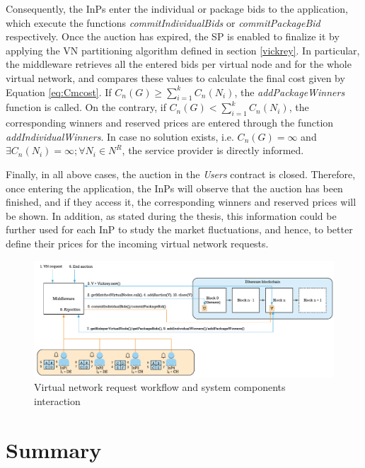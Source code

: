 Consequently, the InPs enter the individual or package bids to the application, which execute the functions \textit{commitIndividualBids} or \textit{commitPackageBid} respectively. Once the auction has expired, the SP is enabled to finalize it by applying the VN partitioning algorithm defined in section \ref{vickrey}. In particular, the middleware retrieves all the entered bids per virtual node and for the whole virtual network, and compares these values to calculate the final cost given by Equation \ref{eq:Cmcost}. If $C_n(G) \geq \sum_{i=1}^{k} C_n(N_i)$, the \textit{addPackageWinners} function is called. On the contrary, if $C_n(G) < \sum_{i=1}^{k} C_n(N_i)$, the corresponding winners and reserved prices are entered through the function \textit{addIndividualWinners}. In case no solution exists, i.e. $C_n(G) = \infty$ and $\exists C_n(N_i) = \infty; \forall N_i \in N^{R}$, the service provider is directly informed.

Finally, in all above cases, the auction in the \textit{Users} contract is closed. Therefore, once entering the application, the InPs will observe that the auction has been finished, and if they access it, the corresponding winners and reserved prices will be shown. In addition, as stated during the thesis, this information could be further used for each InP to study the market fluctuations, and hence, to better define their prices for the incoming virtual network requests.

\begin{figure}[bth]
	\centering
	\includegraphics[width=1\linewidth]{gfx/implementation_workflow}    
  	\caption{Virtual network request workflow and system components interaction}
  	\label{fig:implementationWorkflow}
\end{figure}

\section{Summary}

